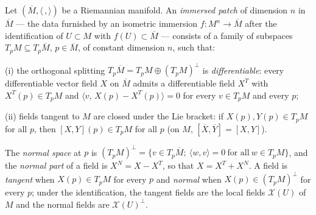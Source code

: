 \begin{definition}
  \label{def:dc-ch6-2-patch}
  \leanok
  Let $(\overline{M},\langle\,,\rangle)$ be a Riemannian manifold. An
  \emph{immersed patch} of dimension $n$ in $\overline{M}$ — the data furnished
  by an isometric immersion $f:M^n\to\overline{M}$ after the identification of
  $U\subset M$ with $f(U)\subset\overline{M}$ — consists of a family of
  subspaces $T_pM\subseteq T_p\overline{M}$, $p\in\overline{M}$, of constant
  dimension $n$, such that:

  (i) the orthogonal splitting $T_p\overline{M}=T_pM\oplus(T_pM)^\perp$ is
  \emph{differentiable}: every differentiable vector field $X$ on
  $\overline{M}$ admits a differentiable field $X^T$ with $X^T(p)\in T_pM$ and
  $\langle v,\,X(p)-X^T(p)\rangle=0$ for every $v\in T_pM$ and every $p$;

  (ii) fields tangent to $M$ are closed under the Lie bracket: if
  $X(p),Y(p)\in T_pM$ for all $p$, then $[X,Y](p)\in T_pM$ for all $p$ (on $M$,
  $[\overline{X},\overline{Y}]=[X,Y]$).

  The \emph{normal space} at $p$ is
  $(T_pM)^\perp=\{v\in T_p\overline{M};\ \langle w,v\rangle=0\ \text{for all}\
  w\in T_pM\}$, and the \emph{normal part} of a field is $X^N=X-X^T$, so that
  $X=X^T+X^N$. A field is \emph{tangent} when $X(p)\in T_pM$ for every $p$ and
  \emph{normal} when $X(p)\in(T_pM)^\perp$ for every $p$; under the
  identification, the tangent fields are the local fields $\mathcal{X}(U)$ of
  $M$ and the normal fields are $\mathcal{X}(U)^\perp$.
\end{definition}

